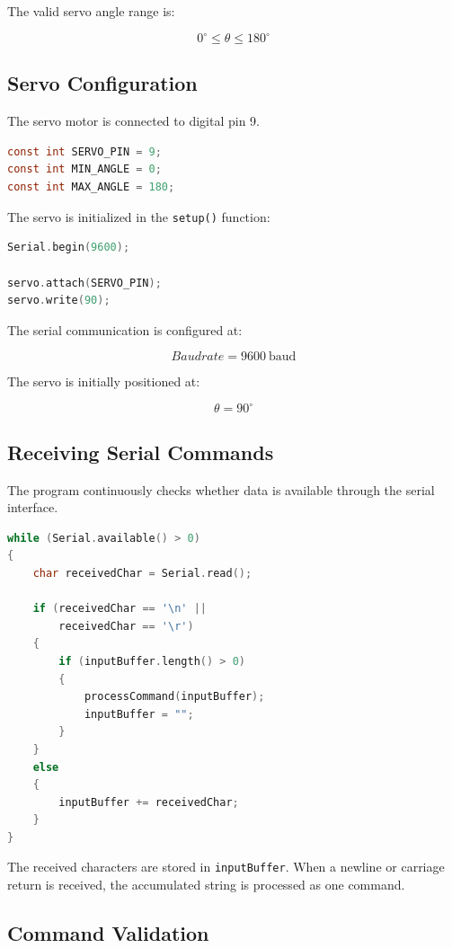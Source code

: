 \documentclass[12pt,a4paper]{article}
\begin{document}
The valid servo angle range is:

\[
0^\circ \leq \theta \leq 180^\circ
\]

\subsection{Servo Configuration}

The servo motor is connected to digital pin 9.

\begin{lstlisting}[language=C]
const int SERVO_PIN = 9;
const int MIN_ANGLE = 0;
const int MAX_ANGLE = 180;
\end{lstlisting}

The servo is initialized in the \texttt{setup()} function:

\begin{lstlisting}[language=C]
Serial.begin(9600);

servo.attach(SERVO_PIN);
servo.write(90);
\end{lstlisting}

The serial communication is configured at:

\[
Baudrate = 9600\ \mathrm{baud}
\]

The servo is initially positioned at:

\[
\theta = 90^\circ
\]

\subsection{Receiving Serial Commands}

The program continuously checks whether data is available through the
serial interface.

\begin{lstlisting}[language=C]
while (Serial.available() > 0)
{
    char receivedChar = Serial.read();

    if (receivedChar == '\n' ||
        receivedChar == '\r')
    {
        if (inputBuffer.length() > 0)
        {
            processCommand(inputBuffer);
            inputBuffer = "";
        }
    }
    else
    {
        inputBuffer += receivedChar;
    }
}
\end{lstlisting}

The received characters are stored in \texttt{inputBuffer}. When a
newline or carriage return is received, the accumulated string is
processed as one command.

\subsection{Command Validation}
\end{document}
